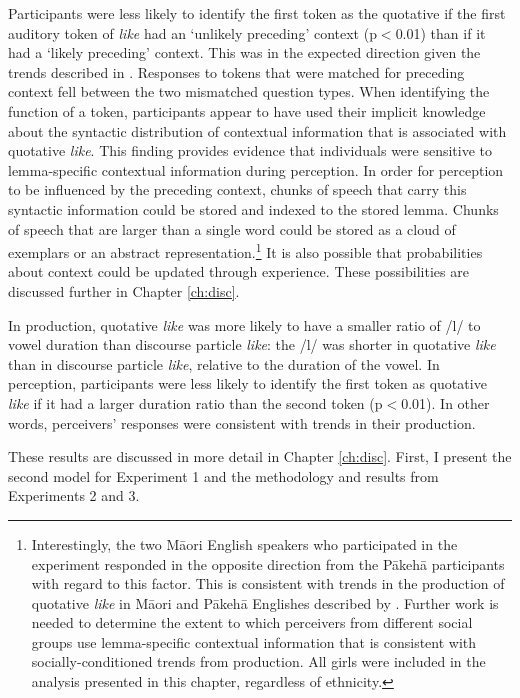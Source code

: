 Participants were less likely to identify the first token as the quotative if the first auditory token of \textit{like} had an `unlikely preceding' context (p$<$0.01) than if it had a `likely preceding' context.  This was in the expected direction given the trends described in .  Responses to tokens that were matched for preceding context fell between the two mismatched question types.  When identifying the function of a token, participants appear to have used their implicit knowledge about the syntactic distribution of contextual information that is associated with quotative \textit{like}.  This finding provides evidence that individuals were sensitive to lemma-specific contextual information during perception.  In order for perception to be influenced by the preceding context, chunks of speech that carry this syntactic information could be stored and indexed to the stored lemma. Chunks of speech that are larger than a single word could be stored as a cloud of exemplars or an abstract representation.\footnote{Interestingly, the two M\=aori English speakers who participated in the experiment responded in the opposite direction from the P\=akeh\=a participants with regard to this factor.  This is consistent with trends in the production of quotative \textit{like} in M\=aori and P\=akeh\=a Englishes described by .  Further work is needed to determine the extent to which perceivers from different social groups use lemma-specific contextual information that is consistent with socially-conditioned trends from production.  All girls were included in the analysis presented in this chapter, regardless of ethnicity.} It is also possible that probabilities about context could be updated through experience.  These possibilities are discussed further in Chapter \ref{ch:disc}.


In production, quotative \textit{like} was more likely to have a smaller ratio of /l/ to vowel duration than discourse particle \textit{like}: the /l/ was shorter in quotative \textit{like} than in discourse particle \textit{like}, relative to the duration of the vowel.  In perception, participants were less likely to identify the first token as quotative \textit{like} if it had a larger duration ratio than the second token (p$<$0.01).  In other words, perceivers' responses were consistent with trends in their production.


These results are discussed in more detail in Chapter \ref{ch:disc}.  First, I present the second model for Experiment 1 and the methodology and results from Experiments 2 and 3. 



